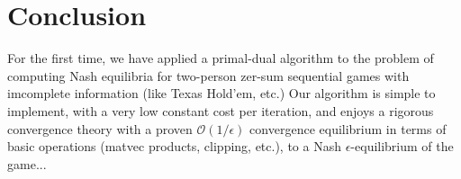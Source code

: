 \documentclass{article} %
\begin{document}

\section{Conclusion}
For the first time, we have applied a primal-dual algorithm to the problem of computing Nash equilibria for two-person zer-sum sequential games with imcomplete information (like Texas Hold'em, etc.) Our algorithm is simple to implement, with a very low constant cost per iteration, and enjoys a rigorous convergence theory with a proven $\mathcal{O}(1/\epsilon)$ convergence equilibrium in terms of basic operations (matvec products, clipping, etc.), to a Nash $\epsilon$-equilibrium of the game...

\medskip \noindent
\small


\end{document}
